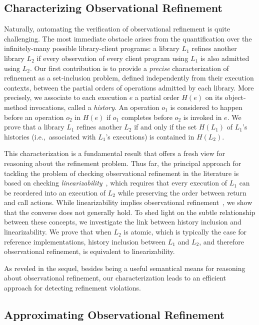 \subsection{Characterizing Observational Refinement}
\label{sec:intro:histories}

Naturally, automating the verification of observational refinement is quite
challenging. The most immediate obstacle arises from the quantification over
the infinitely-many possible library-client programs: a library $L_1$ refines
another library $L_2$ if every observation of every client program using $L_1$
is also admitted using $L_2$. Our first contribution is to provide a
\emph{precise} characterization of refinement as a set-inclusion problem,
defined independently from their execution contexts, between the partial orders
of operations admitted by each library. More precisely, we associate to each
execution $e$ a partial order $H(e)$ on its object-method invocations, called a
\emph{history}. An operation $o_1$ is considered to happen before an operation
$o_2$ in $H(e)$ if $o_1$ completes before $o_2$ is invoked in $e$. We prove
that a library $L_1$ refines another $L_2$ if and only if the set $H(L_1)$ of
$L_1$'s histories (i.e.,~associated with $L_1$'s executions) is contained in
$H(L_2)$.

This characterization is a fundamental result that offers a fresh view for
reasoning about the refinement problem. Thus far, the principal approach for
tackling the problem of checking observational refinement in the literature is
based on checking \emph{linearizability}~\cite{journals/toplas/HerlihyW90},
which requires that every execution of $L_1$ can be reordered into an execution
of $L_2$ while preserving the order between return and call actions. While
linearizability implies observational
refinement~\cite{journals/tcs/FilipovicORY10}, we show that the converse does
not generally hold. To shed light on the subtle relationship between these
concepts, we investigate the link between history inclusion and
linearizability. We prove that when $L_2$ is atomic, which is typically the
case for reference implementations, history inclusion between $L_1$ and $L_2$,
and therefore observational refinement, is equivalent to linearizability.

As reveled in the sequel, besides being a useful semantical means for reasoning
about observational refinement, our characterization leads to an efficient
approach for detecting refinement violations.

\subsection{Approximating Observational Refinement}
\label{sec:intro:approx}

